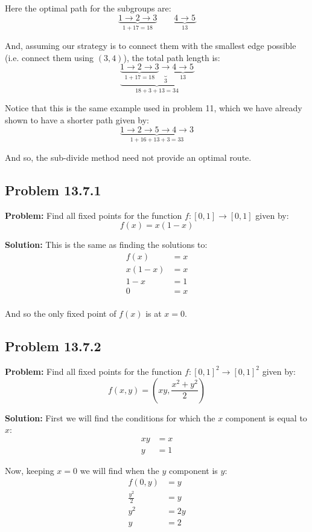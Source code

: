 \documentclass{article}
\begin{document}
Here the optimal path for the subgroups are:
$$\underbrace{1\to2\to3}_{1+17=18}\qquad\underbrace{4\to5}_{13}$$

And, assuming our strategy is to connect them with the smallest edge possible (i.e. connect them using $(3,4)$), the total path length is:
$$\underbrace{\underbrace{1\to2\to3}_{1+17=18}\underbrace{\to}_{3}\underbrace{4\to5}_{13}}_{18+3+13=34}$$

Notice that this is the same example used in problem 11, which we have already shown to have a shorter path given by:
$$\underbrace{1\to2\to5\to4\to3}_{1+16+13+3=33}$$

And so, the sub-divide method need not provide an optimal route.

\subsection*{Problem 13.7.1}
\noindent\textbf{Problem:} Find all fixed points for the function $f:[0,1]\to[0,1]$ given by:
$$f(x)=x(1-x)$$
\bigskip

\noindent\textbf{Solution:} This is the same as finding the solutions to:
\begin{align*}
  f(x)&=x\\
  x(1-x)&=x\\
  1-x&=1\tag{$x=0$ is a solution}\\
  0&=x\\
\end{align*}

And so the only fixed point of $f(x)$ is at $x=0$.

\subsection*{Problem 13.7.2}
\noindent\textbf{Problem:} Find all fixed points for the function $f:[0,1]^2\to[0,1]^2$ given by:
$$f(x,y)=\left(xy,\frac{x^2+y^2}{2}\right)$$
\bigskip

\noindent\textbf{Solution:} First we will find the conditions for which the $x$ component is equal to $x$:
\begin{align*}
  xy&=x\\
  y&=1\tag{$x=0$ is a solution}
\end{align*}

Now, keeping $x=0$ we will find when the $y$ component is $y$:
\begin{align*}
  f(0,y)&=y\\
  \frac{y^2}{2}&=y\\
  y^2&=2y\\
  y&=2\tag{$y=0$ is a solution}
\end{align*}
\end{document}
